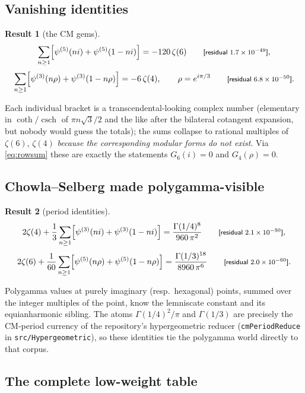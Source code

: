 \documentclass[11pt]{article}
\newtheorem{result}{Result}[section]
\theoremstyle{remark}
\newcommand{\dps}[1]{\textsf{\footnotesize[#1]}}
\begin{document}
\subsection{Vanishing identities}

\begin{result}[the CM gems]\label{res:vanishing}
\[
\sum_{n\ge 1}\Bigl[\psi^{(5)}(ni)+\psi^{(5)}(1-ni)\Bigr]=-120\,\zeta(6)
\qquad\text{\dps{residual $1.7\times10^{-49}$}},
\]
\[
\sum_{n\ge 1}\Bigl[\psi^{(3)}(n\rho)+\psi^{(3)}(1-n\rho)\Bigr]=-6\,\zeta(4),
\qquad \rho=e^{i\pi/3}
\qquad\text{\dps{residual $6.8\times10^{-50}$}}.
\]
\end{result}

Each individual bracket is a transcendental-looking complex number (elementary in
$\coth/\operatorname{csch}$ of $\pi n\sqrt3/2$ and the like after the bilateral cotangent
expansion, but nobody would guess the totals); the sums collapse to rational multiples of
$\zeta(6)$, $\zeta(4)$ \emph{because the corresponding modular forms do not exist}. Via
\eqref{eq:rowsum} these are exactly the statements $G_6(i)=0$ and $G_4(\rho)=0$.

\subsection{Chowla--Selberg made polygamma-visible}

\begin{result}[period identities]\label{res:periods}
\[
2\zeta(4)+\frac13\sum_{n\ge 1}\Bigl[\psi^{(3)}(ni)+\psi^{(3)}(1-ni)\Bigr]
=\frac{\Gamma(1/4)^8}{960\,\pi^2}
\qquad\text{\dps{residual $2.1\times10^{-50}$}},
\]
\[
2\zeta(6)+\frac1{60}\sum_{n\ge 1}\Bigl[\psi^{(5)}(n\rho)+\psi^{(5)}(1-n\rho)\Bigr]
=\frac{\Gamma(1/3)^{18}}{8960\,\pi^6}
\qquad\text{\dps{residual $2.0\times10^{-60}$}}.
\]
\end{result}

Polygamma values at purely imaginary (resp.\ hexagonal) points, summed over the integer
multiples of the point, know the lemniscate constant and its equianharmonic sibling. The
atoms $\Gamma(1/4)^2/\pi$ and $\Gamma(1/3)$ are precisely the CM-period currency of the
repository's hypergeometric reducer (\texttt{cmPeriodReduce} in \texttt{src/Hypergeometric}),
so these identities tie the polygamma world directly to that corpus.

\subsection{The complete low-weight table}
\end{document}
